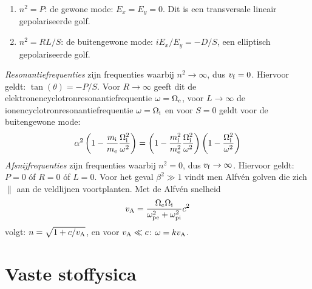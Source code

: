 \begin{enumerate}
\item $n^2=P$: de gewone mode: $E_x=E_y=0$. Dit is een transversale lineair
      gepolariseerde golf.
\item $n^2=RL/S$: de buitengewone mode: $iE_x/E_y=-D/S$, een elliptisch
      gepolariseerde golf.
\end{enumerate}
{\it Resonantiefrequenties} zijn frequenties waarbij $n^2\rightarrow\infty$,
dus $v_{\rm f}=0$. Hiervoor geldt: $\tan(\theta)=-P/S$. Voor $R\rightarrow\infty$
geeft dit de elektronencyclotronresonantiefrequentie $\omega=\Omega_{\rm e}$,
voor $L\rightarrow\infty$ de ionencyclotronresonantiefrequentie $\omega=\Omega_{\rm i}$
en voor $S=0$ geldt voor de buitengewone mode:
\[
\alpha^2\left(1-\frac{m_{\rm i}}{m_{\rm e}}\frac{\Omega_{\rm i}^2}{\omega^2}\right)=
\left(1-\frac{m_{\rm i}^2}{m_{\rm e}^2}\frac{\Omega_{\rm i}^2}{\omega^2}\right)
\left(1-\frac{\Omega_{\rm i}^2}{\omega^2}\right)
\]
{\it Afsnijfrequenties} zijn frequenties waarbij $n^2=0$, dus
$v_{\rm f}\rightarrow\infty$. Hiervoor geldt: $P=0$ \'of $R=0$ \'of $L=0$.
\npar
Voor het geval $\beta^2\gg1$ vindt men Alfv\'en golven die zich $\parallel$
aan de veldlijnen voortplanten. Met de Alfv\'en snelheid
\[
v_{\rm A}=\frac{\Omega_{\rm e}\Omega_{\rm i}}{\omega_{\rm pe}^2+\omega_{\rm pi}^2}c^2
\]
volgt: $n=\sqrt{1+c/v_{\rm A}}$, en voor $v_{\rm A}\ll c$: $\omega=kv_{\rm A}$.

\chapter{Vaste stoffysica}
\def\x{\hbar\omega/kT}
\def\ho{\hbar\omega}
